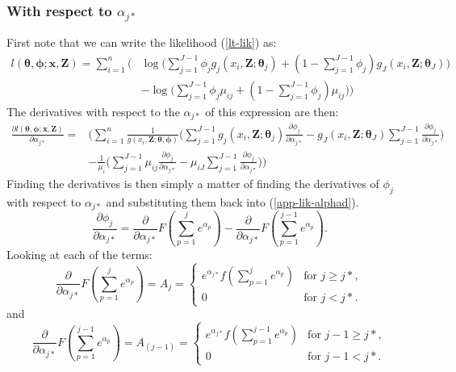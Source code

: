 \documentclass[useAMS,referee, usegraphicx]{biom}
\begin{document}
\subsubsection*{With respect to $\alpha_{j*}$}

First note that we can write the likelihood (\ref{lt-lik}) as:
\begin{align*}
l(\bm{\theta},\bm{\phi}; \mathbf{x},\mathbf{Z}) = \sum_{i=1}^n\Big( &\log \Big( \sum_{j=1}^{J-1} \phi_j g_j(x_i,\mathbf{Z}; \bm{\theta}_j) + (1-\sum_{j=1}^{J-1} \phi_j) g_J(x_i,\mathbf{Z}; \bm{\theta}_J)\Big) \\
&-  \log \Big(\sum_{j=1}^{J-1} \phi_j \mu_{ij} + (1-\sum_{j=1}^{J-1} \phi_j) \mu_{ij} \Big) \Big)
\end{align*}
The derivatives with respect to the $\alpha_{j*}$ of this expression are then:
\begin{align}
\frac{\partial l(\bm{\theta},\bm{\phi}; \mathbf{x},\mathbf{Z})}{\partial \alpha_{j*}} = &\Big( \sum_{i=1}^n \frac{1}{g(x_i,\mathbf{Z}; \bm{\theta},\bm{\phi})} \Big( \sum_{j=1}^{J-1} g_j(x_i,\mathbf{Z}; \bm{\theta}_j) \frac{\partial \phi_j}{\partial \alpha_{j*}}  -g_J(x_i,\mathbf{Z}; \bm{\theta}_J) \sum_{j=1}^{J-1}  \frac{\partial \phi_j}{\partial \alpha_{j*}}\Big) \\
&- \frac{1}{\mu_i} \Big(\sum_{j=1}^{J-1} \mu_{ij} \frac{\partial \phi_j}{\partial \alpha_{j*}} - \mu_{iJ} \sum_{j=1}^{J-1}   \frac{\partial \phi_j}{\partial \alpha_{j*}} \Big)\Big)
\label{app-lik-alphad}
\end{align}
Finding the derivatives is then simply a matter of finding the derivatives of $\phi_{j}$ with respect to $\alpha_{j*}$ and substituting them back into (\ref{app-lik-alphad}).
\begin{equation*}
\frac{\partial \phi_j}{\partial \alpha_{j*}} = \frac{\partial}{\partial \alpha_{j*}}F(\sum_{p=1}^j e^{\alpha_p}) - \frac{\partial}{\partial \alpha_{j*}} F(\sum_{p=1}^{j-1} e^{\alpha_p}).
\end{equation*}
Looking at each of the terms:
\begin{equation*}
\frac{\partial}{\partial \alpha_{j*}} F(\sum_{p=1}^j e^{\alpha_p})=A_{j}=\begin{cases}
e^{\alpha_{j*}}f(\sum_{p=1}^j e^{\alpha_p})& \text{for $j\geq j*$},\\
0 & \text{for $j<j*$}.
\end{cases}
\end{equation*}
and
\begin{equation*}
\frac{\partial}{\partial \alpha_{j*}} F(\sum_{p=1}^{j-1} e^{\alpha_p})=A_{(j-1)}=\begin{cases}
e^{\alpha_{j*}}f(\sum_{p=1}^{j-1} e^{\alpha_p})& \text{for $j-1\geq j*$},\\
0 & \text{for $j-1<j*$}.
\end{cases}
\end{equation*}
\end{document}
